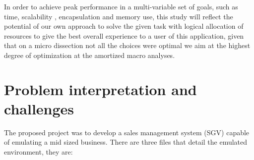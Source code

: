 \documentclass[a4paper]{report}
\begin{document}
In order to achieve peak performance in a multi-variable set of goals, such as time, scalability , encapsulation and
memory use, this study will reflect the potential of our own approach to solve the given task with logical allocation of resources to give the best overall experience to a user of this application, given that on a micro dissection not all the choices were optimal we aim at the highest degree of optimization at the amortized
macro analyses.

\chapter{Problem interpretation and challenges}\label{chap:Problem interpretation and challenges}

The proposed project was to develop a sales management system (SGV) capable of emulating a mid sized business. There are three files that detail the emulated environment, they are:
\end{document}
